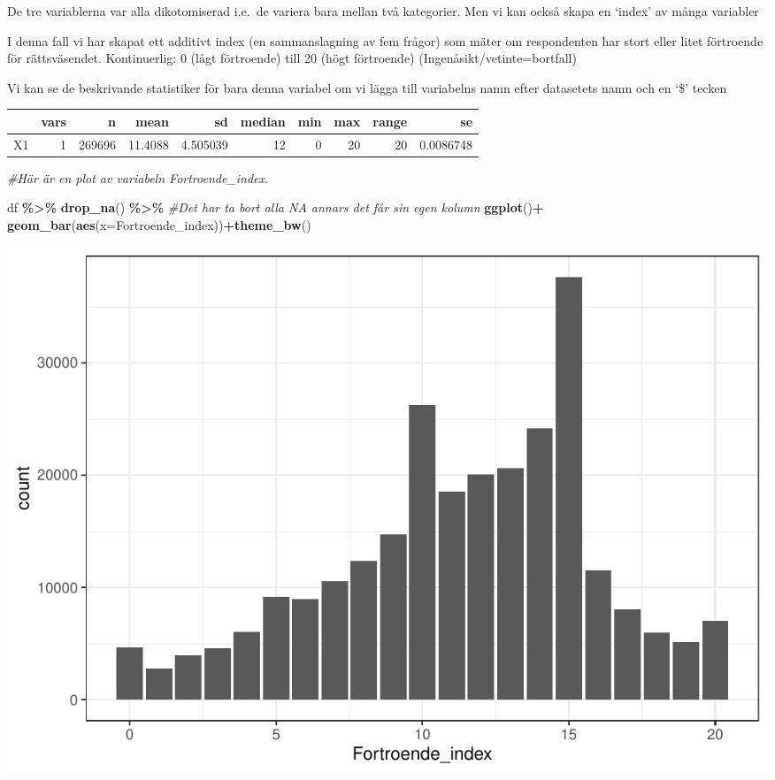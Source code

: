 \documentclass[
]{book}
\newenvironment{Shaded}{\begin{snugshade}}{\end{snugshade}}
\newcommand{\AttributeTok}[1]{\textcolor[rgb]{0.13,0.29,0.53}{#1}}
\newcommand{\CommentTok}[1]{\textcolor[rgb]{0.56,0.35,0.01}{\textit{#1}}}
\newcommand{\ConstantTok}[1]{\textcolor[rgb]{0.56,0.35,0.01}{#1}}
\newcommand{\FunctionTok}[1]{\textcolor[rgb]{0.13,0.29,0.53}{\textbf{#1}}}
\newcommand{\NormalTok}[1]{#1}
\newcommand{\SpecialCharTok}[1]{\textcolor[rgb]{0.81,0.36,0.00}{\textbf{#1}}}
\begin{document}
De tre variablerna var alla dikotomiserad i.e.~de variera bara mellan
två kategorier. Men vi kan också skapa en `index' av många variabler

I denna fall vi har skapat ett additivt index (en sammanslagning av fem frågor) som mäter om respondenten har stort eller litet förtroende för rättsväsendet. Kontinuerlig: 0 (lågt förtroende) till 20 (högt förtroende)
(Ingenåsikt/vetinte=bortfall)

Vi kan se de beskrivande statistiker för bara denna variabel om vi lägga till
variabelns namn efter datasetets namn och en `\$' tecken

\begin{Shaded}
\end{Shaded}

\begin{tabular}{l|r|r|r|r|r|r|r|r|r}
\hline
  & vars & n & mean & sd & median & min & max & range & se\\
\hline
X1 & 1 & 269696 & 11.4088 & 4.505039 & 12 & 0 & 20 & 20 & 0.0086748\\
\hline
\end{tabular}

\begin{Shaded}
\begin{Highlighting}[]
\CommentTok{\#Här är en plot av variabeln \textquotesingle{}Fortroende\_index\textquotesingle{}.  }

\NormalTok{df }\SpecialCharTok{\%\textgreater{}\%} \FunctionTok{drop\_na}\NormalTok{() }\SpecialCharTok{\%\textgreater{}\%} \CommentTok{\#Det har ta bort alla NA annars det får sin egen kolumn}
  \FunctionTok{ggplot}\NormalTok{()}\SpecialCharTok{+} \FunctionTok{geom\_bar}\NormalTok{(}\FunctionTok{aes}\NormalTok{(}\AttributeTok{x=}\NormalTok{Fortroende\_index))}\SpecialCharTok{+}\FunctionTok{theme\_bw}\NormalTok{()}
\end{Highlighting}
\end{Shaded}

\includegraphics{_main_files/figure-latex/unnamed-chunk-10-1.pdf}
\end{document}
